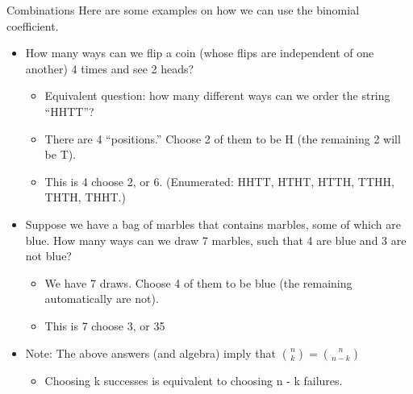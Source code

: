 \documentclass[aspectratio=169]{../latex_main/tntbeamer}  %
\begin{document}
	
	\begin{frame}{Combinations}
	    Here are some examples on how we can use the binomial coefficient.
        \begin{itemize}
            \item How many ways can we flip a coin (whose flips are independent of one another) 4 times and see 2 heads?
            \begin{itemize}
                \item Equivalent question: how many different ways can we order the string “HHTT”?
                \item There are 4 “positions.” Choose 2 of them to be H (the remaining 2 will be T).
                \item This is 4 choose 2, or 6. (Enumerated: HHTT, HTHT, HTTH, TTHH, THTH, THHT.)
            \end{itemize}
            \item Suppose we have a bag of marbles that contains marbles, some of which are blue. How many ways can we draw 7 marbles, such that 4 are blue and 3 are not blue?
            \begin{itemize}
                \item We have 7 draws. Choose 4 of them to be blue (the remaining automatically are not).
                \item This is 7 choose 3, or 35 
            \end{itemize}
            \item Note: The above answers (and algebra) imply that $\binom{n}{k}=\binom{n}{n-k}$
            \begin{itemize}
                \item Choosing k successes is equivalent to choosing n - k failures.
            \end{itemize}
        \end{itemize}

	\end{frame}
	
\end{document}
